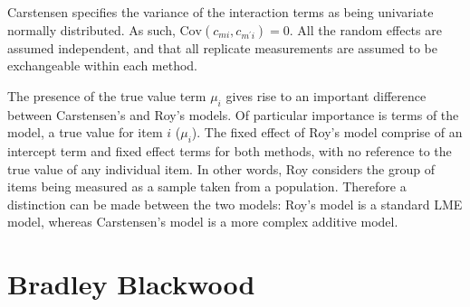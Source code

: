 \documentclass[12pt, a4paper]{report}
\theoremstyle{plain}
\theoremstyle{definition}
\theoremstyle{remark}
\begin{document}
Carstensen specifies the variance of the interaction terms as being univariate normally distributed. As such, $\mathrm{Cov}(c_{mi}, c_{m^\prime i})= 0.$ All the random effects are assumed independent, and that all replicate measurements are assumed to be exchangeable within each method.




The presence of the true value term $\mu_i$ gives rise to an important difference between Carstensen's and Roy's models. Of particular importance is terms of the model, a true value for item $i$ ($\mu_{i}$).  The fixed effect of Roy's model comprise of an intercept term and fixed effect terms for both methods, with no reference to the true value of any individual item. In other words, Roy considers the group of items being measured as a sample taken from a population. Therefore a distinction can be made between the two models: Roy's model is a standard LME model, whereas Carstensen's model is a more complex additive model.














	\chapter{Bradley Blackwood}
\end{document}
